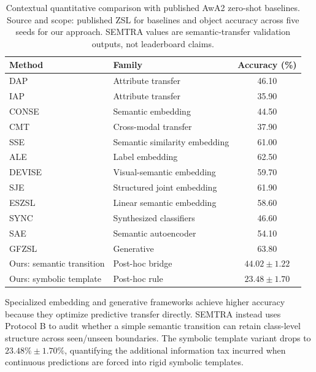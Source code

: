 \documentclass[make,article,submit,pdftex,moreauthors]{Definitions/mdpi}
\begin{document}
\begin{table}[H]
\caption{Contextual quantitative comparison with published AwA2 zero-shot baselines. Source and scope: published ZSL for baselines and object accuracy across five seeds for our approach. SEMTRA values are semantic-transfer validation outputs, not leaderboard claims. \label{tab:sota_quantitative_comparison}}
\centering
\begin{tabularx}{\textwidth}{L L c}
\toprule
\textbf{Method} & \textbf{Family} & \textbf{Accuracy (\%)} \\
\midrule
DAP~\cite{Lampert2009Attribute} & Attribute transfer & 46.10 \\
IAP~\cite{Lampert2014Attribute} & Attribute transfer & 35.90 \\
CONSE~\cite{Norouzi2014ConSE} & Semantic embedding & 44.50 \\
CMT~\cite{Socher2013CMT} & Cross-modal transfer & 37.90 \\
SSE~\cite{Zhang2015SSE} & Semantic similarity embedding & 61.00 \\
ALE~\cite{Akata2016ALE} & Label embedding & 62.50 \\
DEVISE~\cite{Frome2013DeViSE} & Visual-semantic embedding & 59.70 \\
SJE~\cite{Akata2015SJE} & Structured joint embedding & 61.90 \\
ESZSL~\cite{RomeraParedes2015ESZSL} & Linear semantic embedding & 58.60 \\
SYNC~\cite{Changpinyo2016SYNC} & Synthesized classifiers & 46.60 \\
SAE~\cite{Kodirov2017SAE} & Semantic autoencoder & 54.10 \\
GFZSL~\cite{Verma2017GFZSL} & Generative & 63.80 \\
Ours: semantic transition & Post-hoc bridge & $44.02 \pm 1.22$ \\
Ours: symbolic template & Post-hoc rule & $23.48 \pm 1.70$ \\
\bottomrule
\end{tabularx}
\end{table}

Specialized embedding and generative frameworks achieve higher accuracy because they optimize predictive transfer directly. SEMTRA instead uses Protocol B to audit whether a simple semantic transition can retain class-level structure across seen/unseen boundaries. The symbolic template variant drops to $23.48\% \pm 1.70\%$, quantifying the additional information tax incurred when continuous predictions are forced into rigid symbolic templates.
\end{document}
